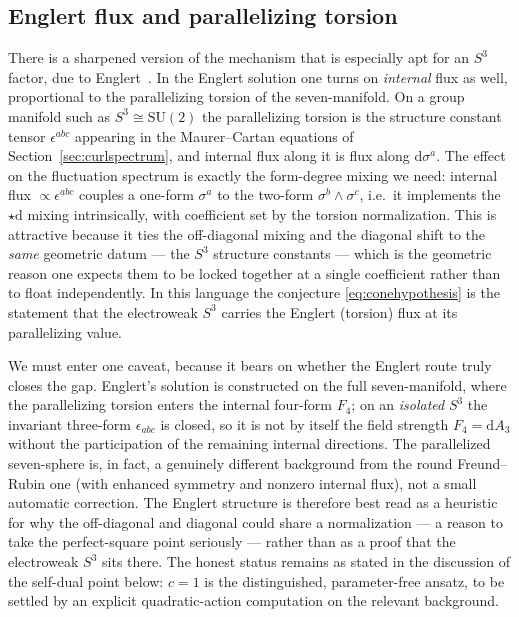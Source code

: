 \documentclass[11pt]{article}
\theoremstyle{plain}
\theoremstyle{definition}
\newcommand{\dd}{\mathrm{d}}
\newcommand{\SU}{\mathrm{SU}}
\begin{document}
\subsection{Englert flux and parallelizing torsion}
\label{sec:englert}

There is a sharpened version of the mechanism that is especially apt for an
$S^3$ factor, due to Englert~\cite{Englert1982}. In the Englert solution one
turns on \emph{internal} flux as well, proportional to the parallelizing
torsion of the seven-manifold. On a group manifold such as
$S^3\cong\SU(2)$ the parallelizing torsion is the structure
constant tensor $\epsilon^{abc}$ appearing in the Maurer--Cartan equations
of Section~\ref{sec:curlspectrum}, and internal flux along it is flux along
$\dd\sigma^a$. The effect on the fluctuation spectrum is exactly the
form-degree mixing we need: internal flux $\propto\epsilon^{abc}$ couples a
one-form $\sigma^a$ to the two-form $\sigma^b\wedge\sigma^c$, i.e.\ it
implements the $\star\dd$ mixing intrinsically, with coefficient set by the
torsion normalization. This is attractive because it ties the off-diagonal
mixing and the diagonal shift to the \emph{same} geometric datum --- the
$S^3$ structure constants --- which is the geometric reason one expects them
to be locked together at a single coefficient rather than to float
independently. In this language the conjecture \eqref{eq:conehypothesis} is
the statement that the electroweak $S^3$ carries the Englert (torsion)
flux at its parallelizing value.

We must enter one caveat, because it bears on whether the Englert route truly
closes the gap. Englert's solution is constructed on the full seven-manifold,
where the parallelizing torsion enters the internal four-form $F_4$; on an
\emph{isolated} $S^3$ the invariant three-form $\epsilon_{abc}$ is closed, so
it is not by itself the field strength $F_4=\dd A_3$ without the participation
of the remaining internal directions. The parallelized seven-sphere is, in
fact, a genuinely different background from the round Freund--Rubin one (with
enhanced symmetry and nonzero internal flux), not a small automatic
correction. The Englert structure is therefore best read as a heuristic for
why the off-diagonal and diagonal could share a normalization --- a reason to
take the perfect-square point seriously --- rather than as a proof that the
electroweak $S^3$ sits there. The honest status remains as stated in the
discussion of the self-dual point below: $c=1$ is the distinguished,
parameter-free ansatz, to be settled by an explicit quadratic-action
computation on the relevant background.
\end{document}
